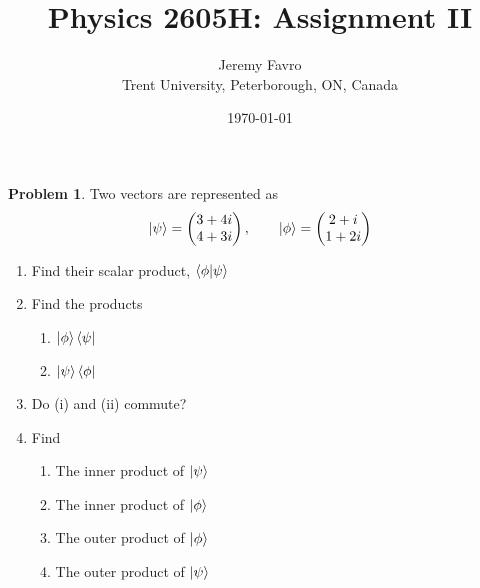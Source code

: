 \documentclass[10pt]{article}
\title{Physics 2605H: Assignment II}
\author{Jeremy Favro \\ Trent University, Peterborough, ON, Canada}
\date{\today}
\theoremstyle{definition}
\newtheorem{problem}{Problem}
\begin{document}
\maketitle

\begin{problem} Two vectors are represented as
$$
  \ket{\psi}=\begin{pmatrix}
    3+4i \\
    4+3i
  \end{pmatrix},\qquad
  \ket{\phi}=\begin{pmatrix}
    2+i \\
    1+2i
  \end{pmatrix}
$$
\begin{enumerate}[label=(\alph*)]
  \item Find their scalar product, $\braket{\phi}{\psi}$
  \item Find the products \begin{enumerate}[label=(\roman*)]
          \item $\ket{\phi}\bra{\psi}$
          \item $\ket{\psi}\bra{\phi}$
        \end{enumerate}
  \item Do (i) and (ii) commute?
  \item Find \begin{enumerate} [label=(\roman*)]
          \item The inner product of $\ket{\psi}$
          \item The inner product of $\ket{\phi}$
          \item The outer product of $\ket{\phi}$
          \item The outer product of $\ket{\psi}$
        \end{enumerate}
\end{enumerate}
\end{problem}
\end{document}
